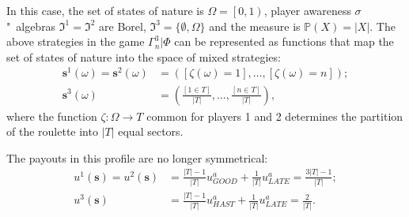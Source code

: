In this case, the set of states of nature is $\Omega = \left[0, 1\right)$, player awareness $\sigma$"~algebras $\mathfrak{I}^1 = \mathfrak{I}^2$ are Borel, $\mathfrak{I}^3 = \{\emptyset, \Omega\}$ and the measure is $\mathbb{P}(X) = \left| X\right|$. The above strategies in the game $\Gamma^3_n | \Phi$ can be represented as functions that map the set of states of nature into the space of mixed strategies: %
\begin{align*}
	\mathbf{s}^1(\omega) = \mathbf{s}^2(\omega) &= ([\zeta(\omega) = 1], \ldots, [\zeta(\omega) = n]); \\ \mathbf{s}^3(\omega) &= \left(\frac{[1 \in T]}{\left| T \right|}, \ldots, \frac{[n \in T]}{\left| T \right|}\right),
\end{align*}
where the function $\zeta : \Omega \rightarrow T$ common for players 1 and 2 determines the partition of the roulette into $\left| T \right|$ equal sectors. %

The payouts in this profile are no longer symmetrical: %
\begin{align*}
	u^1(\mathbf{s}) = u^2(\mathbf{s}) &= \frac{\left| T \right| - 1}{\left| T \right|} u^a_{GOOD} + \frac{1}{\left| T \right|} u^a_{LATE} = \frac{3 \left| T \right| - 1}{\left| T \right|};\\
	u^3(\mathbf{s}) &= \frac{\left| T \right| - 1}{\left| T \right|} u^a_{HAST} + \frac{1}{\left| T \right|} u^a_{LATE} = \frac{2}{\left| T \right|}.
\end{align*}

